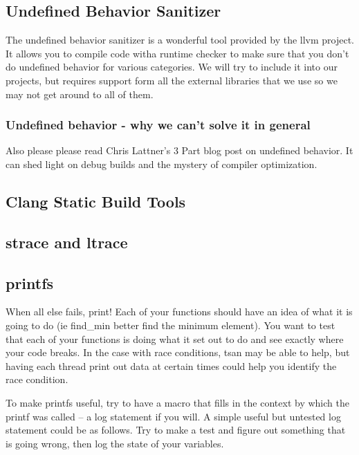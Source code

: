 \subsection{Undefined Behavior Sanitizer}

The undefined behavior sanitizer is a wonderful tool provided by the llvm project. It allows you to compile code witha  runtime checker to make sure that you don't do undefined behavior for various categories. We will try to include it into our projects, but requires support form all the external libraries that we use so we may not get around to all of them.

\subsubsection{Undefined behavior - why we can't solve it in general}

Also please please read Chris Lattner's 3 Part blog post on undefined behavior. It can shed light on debug builds and the mystery of compiler optimization.



\subsection{Clang Static Build Tools}

\subsection{strace and ltrace}

\subsection{printfs}

When all else fails, print! Each of your functions should have an idea of what it is going to do (ie find\_min better find the minimum element).
You want to test that each of your functions is doing what it set out to do and see exactly where your code breaks.
In the case with race conditions, tsan may be able to help, but having each thread print out data at certain times could help you identify the race condition.

To make printfs useful, try to have a macro that fills in the context by which the printf was called -- a log statement if you will. A simple useful but untested log statement could be as follows.
Try to make a test and figure out something that is going wrong, then log the state of your variables.

